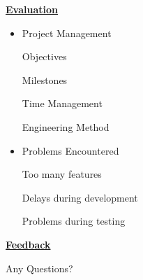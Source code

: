 \documentclass[a4,12pt]{seminar}
\newcommand{\SlideTitle}[1]{\Large \underline{\textbf{#1}}\normalsize}
\begin{document}
\begin{slide}{\SlideTitle{Evaluation}}

\begin{itemize}

\item Project Management

\subitem Objectives

\subitem Milestones

\subitem Time Management

\subitem Engineering Method

\item Problems Encountered

\subitem Too many features

\subitem Delays during development

\subitem Problems during testing

\end{itemize}

\vfill

\end{slide}


\begin{slide}{\SlideTitle{Feedback}}

\vspace{25mm}

\begin{center}
Any Questions?
\end{center}

\vfill

\end{slide}
\end{document}
